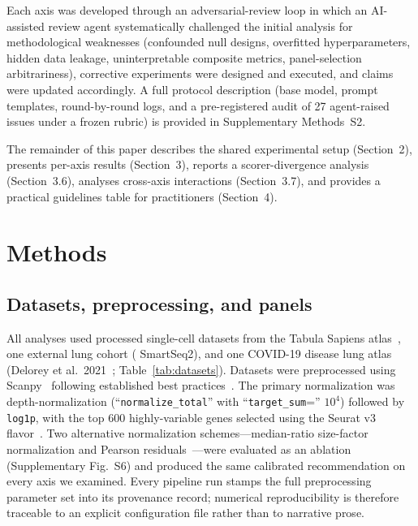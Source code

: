 \documentclass[12pt]{article}
\begin{document}
Each axis was developed through an adversarial-review loop in which an
AI-assisted review agent systematically challenged the initial analysis for
methodological weaknesses (confounded null designs, overfitted
hyperparameters, hidden data leakage, uninterpretable composite metrics,
panel-selection arbitrariness), corrective experiments were designed and
executed, and claims were updated accordingly. A full protocol description
(base model, prompt templates, round-by-round logs, and a
pre-registered audit of 27 agent-raised issues under a frozen rubric)
is provided in Supplementary Methods~S2.

The remainder of this paper describes the shared experimental setup
(Section~2), presents per-axis results (Section~3), reports a
scorer-divergence analysis (Section~3.6), analyses cross-axis
interactions (Section~3.7), and provides a practical guidelines table
for practitioners (Section~4).

\section{Methods}

\subsection{Datasets, preprocessing, and panels}

All analyses used processed single-cell datasets from the Tabula
Sapiens atlas~\citep{TabulaSapiens2022}, one external lung cohort
(\citealt{Travaglini2020} SmartSeq2), and one COVID-19 disease lung
atlas (Delorey et al.\ 2021~\citep{Delorey2021}; Table~\ref{tab:datasets}).
Datasets were preprocessed using Scanpy~\citep{Wolf2018} following established
best practices~\citep{Luecken2019, Heumos2023}. The primary normalization was
depth-normalization (``\texttt{normalize\_total}'' with ``\texttt{target\_sum}='' $10^4$)
followed by \texttt{log1p}, with the top 600 highly-variable genes selected
using the Seurat v3 flavor~\citep{Stuart2019}. Two alternative normalization schemes---median-ratio
size-factor normalization and Pearson residuals~\citep{Lause2021}---were
evaluated as an ablation (Supplementary Fig.~S6) and produced the same
calibrated recommendation on every axis we examined. Every pipeline run
stamps the full preprocessing parameter set into its provenance record;
numerical reproducibility is therefore traceable to an explicit
configuration file rather than to narrative prose.
\end{document}
